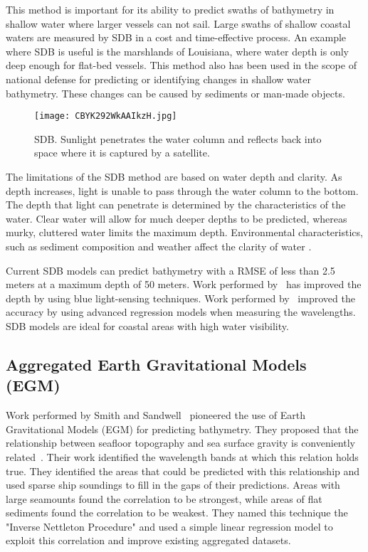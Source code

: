 \par
This method is important for its ability to predict swaths of bathymetry in shallow water where larger vessels can not sail.
Large swaths of shallow coastal waters are measured by \ac{SDB} in a cost and time-effective process.
An example where \ac{SDB} is useful is the marshlands of Louisiana, where water depth is only deep enough for flat-bed vessels.
This method also has been used in the scope of national defense for predicting or identifying changes in shallow water bathymetry.
These changes can be caused by sediments or man-made objects. \\

\begin{figure}[htp]
    \centering
    \texttt{[image: CBYK292WkAAIkzH.jpg]}
    \caption{\ac{SDB}.
    Sunlight penetrates the water column and reflects back into space where it is captured by a satellite.}
    \label{fig:sdb}
\end{figure} 

\medskip


\par
The limitations of the \ac{SDB} method are based on water depth and clarity.
As depth increases, light is unable to pass through the water column to the bottom.
The depth that light can penetrate is determined by the characteristics of the water.
Clear water will allow for much deeper depths to be predicted, whereas murky, cluttered water limits the maximum depth.
Environmental characteristics, such as sediment composition and weather affect the clarity of water \cite{vinayaraj2016satellite}.

\par
Current \ac{SDB} models can predict bathymetry with a \ac{RMSE} of less than 2.5 meters at a maximum depth of 50 meters.
Work performed by~\cite{vinayaraj2016satellite} has improved the depth by using blue light-sensing techniques.
Work performed by~\cite{chybicki2018three} improved the accuracy by using advanced regression models when measuring the wavelengths.
\ac{SDB} models are ideal for coastal areas with high water visibility.

\subsection{Aggregated Earth Gravitational Models (EGM)}
Work performed by Smith and Sandwell~\cite{smith1994bathymetric,smith1997global} pioneered the use of Earth Gravitational Models (EGM) for predicting bathymetry.
They proposed that the relationship between seafloor topography and sea surface gravity is conveniently related~\cite{smith1994bathymetric}.
Their work identified the wavelength bands at which this relation holds true.
They identified the areas that could be predicted with this relationship and used sparse ship soundings to fill in the gaps of their predictions.
Areas with large seamounts found the correlation to be strongest, while areas of flat sediments found the correlation to be weakest.
They named this technique the "Inverse Nettleton Procedure" and used a simple linear regression model to exploit this correlation and improve existing aggregated datasets.

